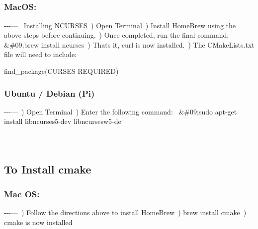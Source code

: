 \subparagraph*{}

\subsubsection*{Mac\+OS\+:}

-\/-\/-\/---~\newline
 Installing N\+C\+U\+R\+S\+ES~) Open Terminal~) Install Home\+Brew using the above steps before continuing.~) Once completed, run the final command\+:~\newline
 \&\#09;brew install ncurses~) That\textquotesingle{}s it, curl is now installed.~) The C\+Make\+Lists.\+txt file will need to include\+:~\newline
 \begin{DoxyVerb}    find_package(CURSES REQUIRED)
\end{DoxyVerb}


\subsubsection*{Ubuntu / Debian (Pi)}

-\/-\/-\/---~) Open Terminal~) Enter the following command\+:~\newline
 \&\#09;sudo apt-\/get install libncurses5-\/dev libncursesw5-\/de~\newline


\subparagraph*{}

~\newline
\subsection*{To Install cmake}

\subparagraph*{}

\subsubsection*{Mac OS\+:}

-\/-\/-\/---~) Follow the directions above to install Home\+Brew~) brew install cmake~) cmake is now installed

